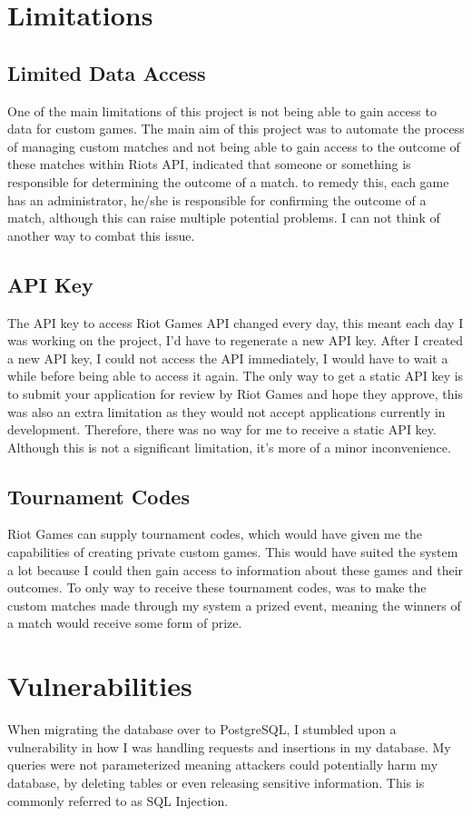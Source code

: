 \section{Limitations}
\subsection{Limited Data Access}
One of the main limitations of this project is not being able to gain access to data for custom games. The main aim of this project was to automate the process of managing custom matches and not being able to gain access to the outcome of these matches within Riots API, indicated that someone or something is responsible for determining the outcome of a match. to remedy this, each game has an administrator, he/she is responsible for confirming the outcome of a match, although this can raise multiple potential problems. I can not think of another way to combat this issue.
\newpage
\subsection{API Key}
The API key to access Riot Games API changed every day, this meant each day I was working on the project, I'd have to regenerate a new API key. After I created a new API key, I could not access the API immediately, I would have to wait a while before being able to access it again. The only way to get a static API key is to submit your application for review by Riot Games and hope they approve, this was also an extra limitation as they would not accept applications currently in development. Therefore, there was no way for me to receive a static API key. Although this is not a significant limitation, it's more of a minor inconvenience.
\subsection{Tournament Codes}
Riot Games can supply tournament codes, which would have given me the capabilities of creating private custom games. This would have suited the system a lot because I could then gain access to information about these games and their outcomes. To only way to receive these tournament codes, was to make the custom matches made through my system a prized event, meaning the winners of a match would receive some form of prize.
\section{Vulnerabilities}
When migrating the database over to PostgreSQL, I stumbled upon a vulnerability in how I was handling requests and insertions in my database. My queries were not parameterized meaning attackers could potentially harm my database, by deleting tables or even releasing sensitive information. This is commonly referred to as SQL Injection. 

